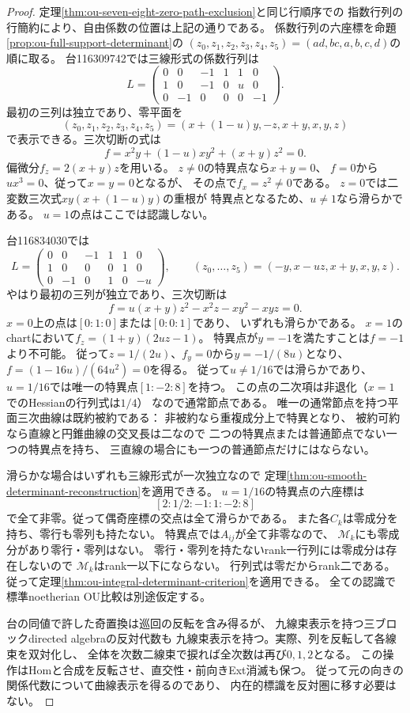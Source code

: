 \begin{proof}
定理\ref{thm:ou-seven-eight-zero-path-exclusion}と同じ行順序での
指数行列の行簡約により、自由係数の位置は上記の通りである。
係数行列の六座標を命題\ref{prop:ou-full-support-determinant}の
$(z_0,z_1,z_2,z_3,z_4,z_5)=(ad,bc,a,b,c,d)$の順に取る。
台116309742では三線形式の係数行列は
\[
 L=\begin{pmatrix}
 0&0&-1&1&1&0\\
 1&0&-1&0&u&0\\
 0&-1&0&0&0&-1
 \end{pmatrix}.
\]
最初の三列は独立であり、零平面を
\[
 (z_0,z_1,z_2,z_3,z_4,z_5)
 =(x+(1-u)y,-z,x+y,x,y,z)
\]
で表示できる。三次切断の式は
\[
 f=x^2y+(1-u)xy^2+(x+y)z^2=0 .
\]
偏微分$f_z=2(x+y)z$を用いる。
$z\ne0$の特異点なら$x+y=0$、
$f=0$から$ux^3=0$、従って$x=y=0$となるが、
その点で$f_x=z^2\ne0$である。
$z=0$では二変数三次式$xy(x+(1-u)y)$の重根が
特異点となるため、$u\ne1$なら滑らかである。
$u=1$の点はここでは認識しない。

台116834030では
\[
 L=\begin{pmatrix}
 0&0&-1&1&1&0\\
 1&0&0&0&1&0\\
 0&-1&0&1&0&-u
 \end{pmatrix},
 \qquad
 (z_0,\ldots,z_5)=(-y,x-uz,x+y,x,y,z).
\]
やはり最初の三列が独立であり、三次切断は
\[
 f=u(x+y)z^2-x^2z-xy^2-xyz=0 .
\]
$x=0$上の点は$[0:1:0]$または$[0:0:1]$であり、
いずれも滑らかである。
$x=1$のchartにおいて$f_z=(1+y)(2uz-1)$。
特異点が$y=-1$を満たすことは$f=-1$より不可能。
従って$z=1/(2u)$、$f_y=0$から$y=-1/(8u)$となり、
$f=(1-16u)/(64u^2)=0$を得る。
従って$u\ne1/16$では滑らかであり、
$u=1/16$では唯一の特異点$[1:-2:8]$を持つ。
この点の二次項は非退化（$x=1$でのHessianの行列式は$1/4$）
なので通常節点である。
唯一の通常節点を持つ平面三次曲線は既約被約である：
非被約なら重複成分上で特異となり、
被約可約なら直線と円錐曲線の交叉長は二なので
二つの特異点または普通節点でない一つの特異点を持ち、
三直線の場合にも一つの普通節点だけにはならない。

滑らかな場合はいずれも三線形式が一次独立なので
定理\ref{thm:ou-smooth-determinant-reconstruction}を適用できる。
$u=1/16$の特異点の六座標は
\[
 [2:1/2:-1:1:-2:8]
\]
で全て非零。従って偶奇座標の交点は全て滑らかである。
また各$C_k$は零成分を持ち、零行も零列も持たない。
特異点では$A_{ij}$が全て非零なので、
$\mathscr M_k$にも零成分があり零行・零列はない。
零行・零列を持たないrank一行列には零成分は存在しないので
$\mathscr M_k$はrank一以下にならない。
行列式は零だからrank二である。
従って定理\ref{thm:ou-integral-determinant-criterion}を適用できる。
全ての認識で標準noetherian OU比較は別途仮定する。

台の同値で許した奇置換は巡回の反転を含み得るが、
九線束表示を持つ三ブロックdirected algebraの反対代数も
九線束表示を持つ。実際、列を反転して各線束を双対化し、
全体を次数二線束で捩れば全次数は再び$0,1,2$となる。
この操作はHomと合成を反転させ、直交性・前向きExt消滅も保つ。
従って元の向きの関係代数について曲線表示を得るのであり、
内在的標識を反対圏に移す必要はない。
\end{proof}

